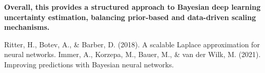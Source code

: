 \documentclass{article}
\begin{document}
\textbf{Overall, this provides a structured approach to Bayesian deep learning uncertainty estimation, balancing prior-based and data-driven scaling mechanisms.}

\begin{thebibliography}{99}
 Ritter, H., Botev, A., & Barber, D. (2018). A scalable Laplace approximation for neural networks.
 Immer, A., Korzepa, M., Bauer, M., & van der Wilk, M. (2021). Improving predictions with Bayesian neural networks.
\end{thebibliography}
\end{document}
